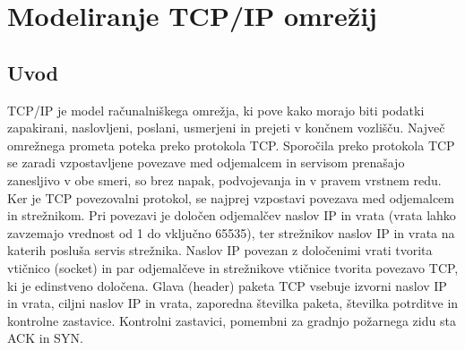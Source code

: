 \documentclass[11pt, a4paper, slovene]{book}
\begin{document}
\chapter{Modeliranje TCP/IP omrežij}
\section{Uvod}

TCP/IP je model računalniškega omrežja, ki pove kako morajo biti podatki
zapakirani, naslovljeni, poslani, usmerjeni in prejeti v končnem vozlišču.
Največ omrežnega prometa poteka preko protokola TCP. Sporočila preko protokola TCP se zaradi vzpostavljene povezave med odjemalcem in servisom prenašajo zanesljivo v obe smeri, so brez napak, podvojevanja in v pravem vrstnem redu. Ker je TCP povezovalni protokol, se najprej vzpostavi povezava med odjemalcem in strežnikom. Pri povezavi je določen odjemalčev naslov IP in vrata (vrata lahko zavzemajo vrednost od 1 do vključno 65535), ter strežnikov naslov IP in vrata na katerih posluša servis strežnika. Naslov IP povezan z določenimi vrati tvorita vtičnico (socket) in par odjemalčeve in strežnikove vtičnice tvorita povezavo TCP, ki je edinstveno določena. Glava (header) paketa TCP vsebuje izvorni naslov IP in vrata, ciljni naslov IP in vrata, zaporedna številka paketa, številka potrditve in kontrolne zastavice. Kontrolni zastavici, pomembni za gradnjo požarnega zidu sta ACK in SYN.
\end{document}

